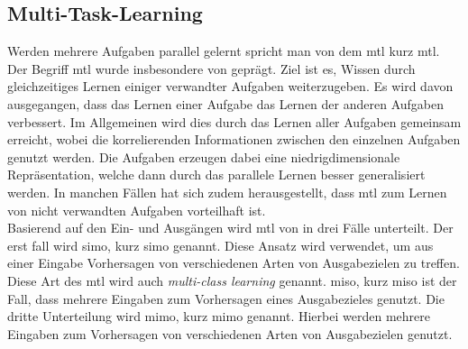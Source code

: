 		\subsection{Multi-Task-Learning}
		Werden mehrere Aufgaben parallel gelernt spricht man von dem \acl{mtl} kurz \ac{mtl}. Der Begriff \ac{mtl} wurde insbesondere von \cite{Caruana.1998} geprägt. Ziel ist es, Wissen durch gleichzeitiges Lernen einiger verwandter Aufgaben weiterzugeben. Es wird davon ausgegangen, dass das Lernen einer Aufgabe das Lernen der anderen Aufgaben verbessert. Im Allgemeinen wird dies durch das Lernen aller Aufgaben gemeinsam erreicht, wobei die korrelierenden Informationen zwischen den einzelnen Aufgaben genutzt werden. Die Aufgaben erzeugen dabei eine niedrigdimensionale Repräsentation, welche dann durch das parallele Lernen besser generalisiert werden. In manchen Fällen hat sich zudem herausgestellt, dass \acl{mtl} zum Lernen von nicht verwandten Aufgaben vorteilhaft ist. \\
		Basierend auf den Ein- und Ausgängen wird \ac{mtl} von \cite{Thung.2018} in drei Fälle unterteilt. Der erst fall wird  \acl{simo}, kurz \ac{simo} genannt. Diese Ansatz wird verwendet, um aus einer Eingabe Vorhersagen von verschiedenen Arten von Ausgabezielen zu treffen. Diese Art des \ac{mtl} wird auch \textit{multi-class learning} genannt. \acl{miso}, kurz \ac{miso} ist der Fall, dass mehrere Eingaben zum Vorhersagen eines Ausgabezieles genutzt.
		Die dritte Unterteilung wird \acl{mimo}, kurz \ac{mimo} genannt. Hierbei werden mehrere Eingaben zum Vorhersagen von verschiedenen Arten von Ausgabezielen genutzt.
